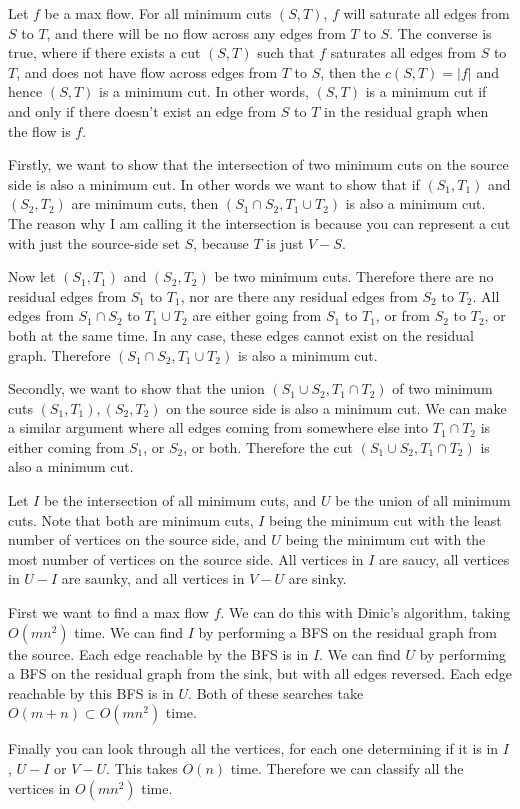 \documentclass{article}
\begin{document}
\begin{solution}

Let $f$ be a max flow.
For all minimum cuts $(S,T)$, $f$ will saturate all edges from $S$ to $T$, 
and there will be no flow across any edges from $T$ to $S$. 
The converse is true, where if there exists a cut $(S,T)$ such that $f$
saturates all edges from $S$ to $T$, and does not have flow across edges from $T$ to $S$,
then the $c(S,T)=|f|$ and hence $(S,T)$ is a minimum cut.
In other words, $(S, T)$ is a minimum cut if and only if there doesn't exist an edge from $S$ to $T$
in the residual graph when the flow is $f$.

Firstly, we want to show that the intersection of two minimum cuts on the source side is also a minimum cut.
In other words we want to show that if $(S_1, T_1)$ and $(S_2, T_2)$ are minimum cuts,
then $(S_1\cap S_2, T_1 \cup T_2)$ is also a minimum cut.
The reason why I am calling it the intersection is because you can represent a cut with just the source-side set $S$,
because $T$ is just $V - S$.

Now let $(S_1, T_1)$ and $(S_2, T_2)$ be two minimum cuts.
Therefore there are no residual edges from $S_1$ to $T_1$, nor are there any residual edges from $S_2$ to $T_2$.
All edges from $S_1\cap S_2$ to $T_1\cup T_2$ are either going from $S_1$ to $T_1$, or from $S_2$ to $T_2$, or both at the same time.
In any case, these edges cannot exist on the residual graph. 
Therefore $(S_1\cap S_2, T_1\cup T_2)$ is also a minimum cut.

Secondly, we want to show that the union $(S_1\cup S_2, T_1 \cap T_2)$ of two minimum cuts $(S_1, T_1), (S_2, T_2)$ on the source side is also a minimum cut.
We can make a similar argument where all edges coming from somewhere else into $T_1\cap T_2$ is either coming from 
$S_1$, or $S_2$, or both. Therefore the cut $(S_1\cup S_2, T_1\cap T_2)$ is also a minimum cut.

Let $I$ be the intersection of all minimum cuts, and $U$ be the union of all minimum cuts. 
Note that both are minimum cuts, $I$ being the minimum cut with the least number of vertices on the source side,
and $U$ being the minimum cut with the most number of vertices on the source side.
All vertices in $I$ are saucy, all vertices in $U - I$ are saunky, and all vertices in $V - U$ are sinky.

First we want to find a max flow $f$. We can do this with Dinic's algorithm, taking $O(mn^2)$ time.
We can find $I$ by performing a BFS on the residual graph from the source. 
Each edge reachable by the BFS is in $I$.
We can find $U$ by performing a BFS on the residual graph from the sink, but with all edges reversed.
Each edge reachable by this BFS is in $U$.
Both of these searches take $O(m + n)\subset O(mn^2)$ time.

Finally you can look through all the vertices, for each one determining if it is in $I$, $U-I$ or $V-U$.
This takes $O(n)$ time. Therefore we can classify all the vertices in $O(mn^2)$ time.


\end{solution}
\end{document}
